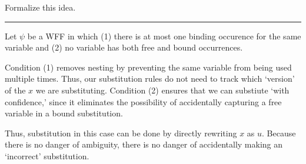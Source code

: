\documentclass{article}
\newcommand*{\Break}{\vspace{0.2cm}\hrule{}\vspace{0.2cm}}
\begin{document}
Formalize this idea.

\Break{}

Let $\psi$ be a WFF in which (1) there is at most one binding occurence for the
same variable and (2) no variable has both free and bound occurrences.

Condition (1) removes nesting by preventing the same variable from being used
multiple times. Thus, our substitution rules do not need to track which
`version' of the $x$ we are substituting. Condition (2) ensures that we can
substiute `with confidence,' since it eliminates the possibility of
accidentally capturing a free variable in a bound substitution.

Thus, substitution in this case can be done by directly rewriting $x$ as
$u$. Because there is no danger of ambiguity, there is no danger of
accidentally making an `incorrect' substitution.
\end{document}
